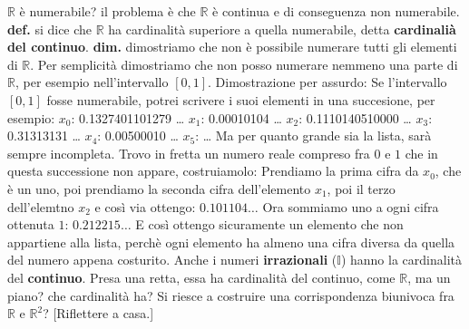 $\mathbb{R}$ è numerabile? il problema è che $\mathbb{R}$ è continua e di conseguenza non  numerabile.\newline
\textbf{def.} si dice che $\mathbb{R}$ ha cardinalità superiore a quella numerabile, detta \textbf{cardinalià del continuo}.\newline
\textbf{dim.} dimostriamo che non è possibile numerare tutti gli elementi di $\mathbb{R}$.\newline
Per semplicità dimostriamo che non posso numerare nemmeno una parte di $\mathbb{R}$, per esempio nell'intervallo $[0,1]$.\newline
Dimostrazione per assurdo:\newline
Se l'intervallo $[0,1]$ fosse numerabile, potrei scrivere i suoi elementi in una succesione, per esempio:\newline
$x_0$: 0.1327401101279 \dots\newline
$x_1$: 0.00010104 \dots\newline
$x_2$: 0.1110140510000 \dots\newline
$x_3$: 0.31313131 \dots\newline
$x_4$: 0.00500010 \dots\newline
$x_5$: \dots \newline
Ma per quanto grande sia la lista, sarà sempre incompleta. Trovo in fretta un numero reale compreso fra $0$ e $1$ che in questa successione non appare, costruiamolo:\newline
Prendiamo la prima cifra da $x_0$, che è un uno, poi prendiamo la seconda cifra dell'elemento $x_1$, poi il terzo dell'elemtno $x_2$ e così via ottengo:\newline
$0.101104 \dots$\newline
Ora sommiamo uno a ogni cifra ottenuta $1$:\newline
$0.212215 \dots$\newline
E così ottengo sicuramente un elemento che non appartiene alla lista, perchè ogni elemento ha almeno una cifra diversa da quella del numero appena costurito.
\newline
\newline
\newline
Anche i numeri \textbf{irrazionali} ($\mathbb{I}$) hanno la cardinalità del \textbf{continuo}.\newline
\newline
\newline
Presa una retta, essa ha cardinalità del continuo, come $\mathbb{R}$, ma un piano? che cardinalità ha? Si riesce a costruire una corrispondenza biunivoca fra $\mathbb{R}$ e $\mathbb{R}^2$? [Riflettere a casa.]
\newpage